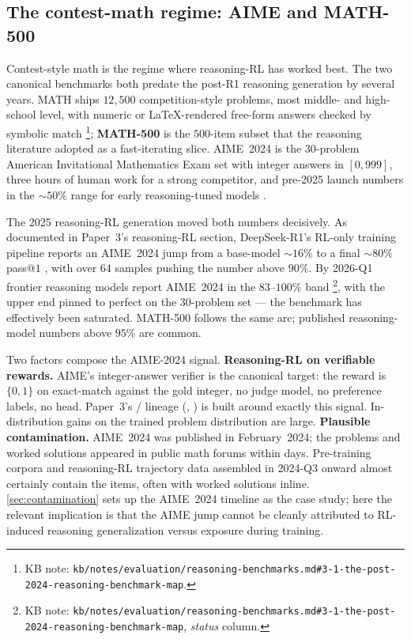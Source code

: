 \subsection{The contest-math regime: AIME and MATH-500}
\label{sec:reasoning-aime}

Contest-style math is the regime where reasoning-RL has worked best.
The two canonical benchmarks both predate the post-R1 reasoning
generation by several years. MATH 
ships $12{,}500$ competition-style problems, most middle- and
high-school level, with numeric or LaTeX-rendered free-form answers
checked by symbolic match%
\footnote{KB note: \texttt{kb/notes/evaluation/reasoning-benchmarks.md\#3-1-the-post-2024-reasoning-benchmark-map}.};
\textbf{MATH-500} is the $500$-item subset that the reasoning literature
adopted as a fast-iterating slice. AIME~2024 is the $30$-problem
American Invitational Mathematics Exam set with integer answers in
$[0, 999]$, three hours of human work for a strong competitor, and
pre-2025 launch numbers in the $\sim 50\%$ range for early
reasoning-tuned models .

The 2025 reasoning-RL generation moved both numbers decisively. As
documented in Paper~3's reasoning-RL section,
DeepSeek-R1's RL-only training
pipeline reports an AIME~2024 jump from a base-model $\sim 16\%$ to
a final $\sim 80\%$ pass$@1$
, with  over $64$ samples
pushing the number above $90\%$. By 2026-Q1 frontier reasoning models
report AIME~2024 in the $83$--$100\%$ band%
\footnote{KB note: \texttt{kb/notes/evaluation/reasoning-benchmarks.md\#3-1-the-post-2024-reasoning-benchmark-map}, \emph{ status} column.},
with the upper end pinned to perfect on the $30$-problem set --- the
benchmark has effectively been saturated. MATH-500 follows the same
arc; published reasoning-model numbers above $95\%$ are common.

Two factors compose the AIME-2024  signal.
\textbf{Reasoning-RL on verifiable rewards.} AIME's integer-answer
verifier is the canonical  target: the reward is $\{0, 1\}$ on
exact-match against the gold integer, no judge model, no
preference labels, no  head. Paper~3's / lineage
(, ) is built around
exactly this signal. In-distribution gains on the trained problem
distribution are large.
\textbf{Plausible contamination.} AIME~2024 was published in
February~2024; the problems and worked solutions appeared in public
math forums within days. Pre-training corpora and reasoning-RL
trajectory data assembled in 2024-Q3 onward almost certainly contain
the items, often with worked solutions inline. \cref{sec:contamination}
sets up the AIME~2024 timeline as the case study; here the relevant
implication is that the AIME jump cannot be cleanly attributed to
RL-induced reasoning generalization versus exposure during training.

